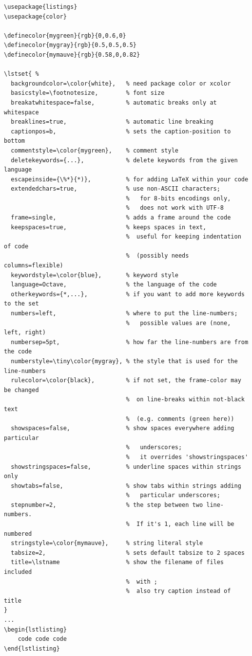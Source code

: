 \documentclass{article}
\begin{document}
\begin{verbatim}
\usepackage{listings}
\usepackage{color}

\definecolor{mygreen}{rgb}{0,0.6,0}
\definecolor{mygray}{rgb}{0.5,0.5,0.5}
\definecolor{mymauve}{rgb}{0.58,0,0.82}

\lstset{ %
  backgroundcolor=\color{white},   % need package color or xcolor
  basicstyle=\footnotesize,        % font size
  breakatwhitespace=false,         % automatic breaks only at whitespace
  breaklines=true,                 % automatic line breaking
  captionpos=b,                    % sets the caption-position to bottom
  commentstyle=\color{mygreen},    % comment style
  deletekeywords={...},            % delete keywords from the given language
  escapeinside={\%*}{*)},          % for adding LaTeX within your code
  extendedchars=true,              % use non-ASCII characters;
                                   %   for 8-bits encodings only,
                                   %   does not work with UTF-8
  frame=single,                    % adds a frame around the code
  keepspaces=true,                 % keeps spaces in text,
                                   %  useful for keeping indentation of code
                                   %  (possibly needs columns=flexible)
  keywordstyle=\color{blue},       % keyword style
  language=Octave,                 % the language of the code
  otherkeywords={*,...},           % if you want to add more keywords to the set
  numbers=left,                    % where to put the line-numbers;
                                   %   possible values are (none, left, right)
  numbersep=5pt,                   % how far the line-numbers are from the code
  numberstyle=\tiny\color{mygray}, % the style that is used for the line-numbers
  rulecolor=\color{black},         % if not set, the frame-color may be changed
                                   %  on line-breaks within not-black text
                                   %  (e.g. comments (green here))
  showspaces=false,                % show spaces everywhere adding particular
                                   %   underscores;
                                   %   it overrides 'showstringspaces'
  showstringspaces=false,          % underline spaces within strings only
  showtabs=false,                  % show tabs within strings adding
                                   %   particular underscores;
  stepnumber=2,                    % the step between two line-numbers.
                                   %  If it's 1, each line will be numbered
  stringstyle=\color{mymauve},     % string literal style
  tabsize=2,                       % sets default tabsize to 2 spaces
  title=\lstname                   % show the filename of files included
                                   %  with ;
                                   %  also try caption instead of title
}
...
\begin{lstlisting}
    code code code
\end{lstlisting}
\end{verbatim}
\end{document}
